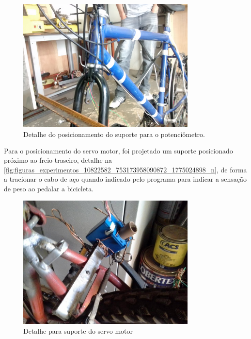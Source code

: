 \begin{figure}[h]
  \centering
	\includegraphics[width=0.8\textwidth]{figuras/experimentos/IMG_20141201_102632506}
  \caption{Detalhe do posicionamento do suporte para o potenciômetro.}
  \label{fig:figuras_experimentos_img_20141201_102632506}
\end{figure}

Para o posicionamento do servo motor, foi projetado um suporte posicionado próximo ao freio traseiro, detalhe na \autoref{fig:figuras_experimentos_10822582_753173958090872_1775024898_n}, de forma a tracionar o cabo de aço quando indicado pelo programa para indicar a sensação de peso ao pedalar a bicicleta.


\begin{figure}[h]
  \centering
	\includegraphics[width=0.8\textwidth]{figuras/experimentos/10822582_753173958090872_1775024898_n}
  \caption{Detalhe para suporte do servo motor}
  \label{fig:figuras_experimentos_10822582_753173958090872_1775024898_n}
\end{figure}



